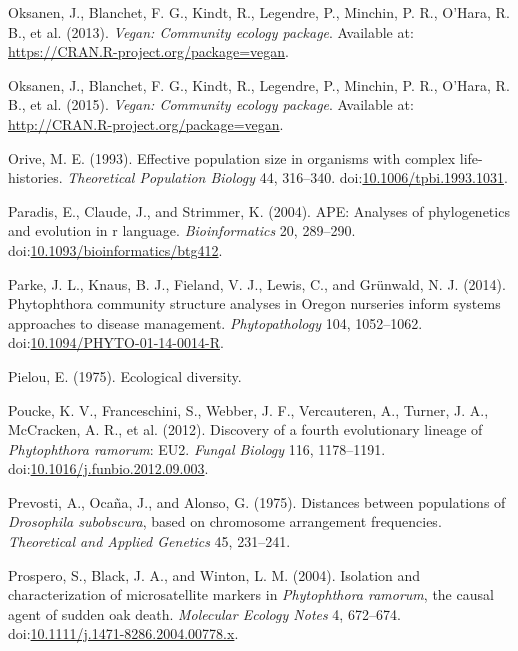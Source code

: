 \documentclass[double,12pt]{beavtex}
\begin{document}
  \hypertarget{ref-oksanen2013vegan}{}
  Oksanen, J., Blanchet, F. G., Kindt, R., Legendre, P., Minchin, P. R.,
  O'Hara, R. B., et al. (2013). \emph{Vegan: Community ecology package}.
  Available at: \url{https://CRAN.R-project.org/package=vegan}.
  
  \hypertarget{ref-oksanen2015vegan}{}
  Oksanen, J., Blanchet, F. G., Kindt, R., Legendre, P., Minchin, P. R.,
  O'Hara, R. B., et al. (2015). \emph{Vegan: Community ecology package}.
  Available at: \url{http://CRAN.R-project.org/package=vegan}.
  
  \hypertarget{ref-orive1993effective}{}
  Orive, M. E. (1993). Effective population size in organisms with complex
  life-histories. \emph{Theoretical Population Biology} 44, 316--340.
  doi:\href{https://doi.org/10.1006/tpbi.1993.1031}{10.1006/tpbi.1993.1031}.
  
  \hypertarget{ref-paradis2004ape}{}
  Paradis, E., Claude, J., and Strimmer, K. (2004). APE: Analyses of
  phylogenetics and evolution in r language. \emph{Bioinformatics} 20,
  289--290.
  doi:\href{https://doi.org/10.1093/bioinformatics/btg412}{10.1093/bioinformatics/btg412}.
  
  \hypertarget{ref-parke2014phytophthora}{}
  Parke, J. L., Knaus, B. J., Fieland, V. J., Lewis, C., and Grünwald, N.
  J. (2014). Phytophthora community structure analyses in Oregon nurseries
  inform systems approaches to disease management. \emph{Phytopathology}
  104, 1052--1062.
  doi:\href{https://doi.org/10.1094/PHYTO-01-14-0014-R}{10.1094/PHYTO-01-14-0014-R}.
  
  \hypertarget{ref-pielou1975ecological}{}
  Pielou, E. (1975). Ecological diversity.
  
  \hypertarget{ref-vanpoucke2012discovery}{}
  Poucke, K. V., Franceschini, S., Webber, J. F., Vercauteren, A., Turner,
  J. A., McCracken, A. R., et al. (2012). Discovery of a fourth
  evolutionary lineage of \emph{Phytophthora ramorum}: EU2. \emph{Fungal
  Biology} 116, 1178--1191.
  doi:\href{https://doi.org/10.1016/j.funbio.2012.09.003}{10.1016/j.funbio.2012.09.003}.
  
  \hypertarget{ref-prevosti1975distances}{}
  Prevosti, A., Ocaña, J., and Alonso, G. (1975). Distances between
  populations of \emph{Drosophila subobscura}, based on chromosome
  arrangement frequencies. \emph{Theoretical and Applied Genetics} 45,
  231--241.
  
  \hypertarget{ref-prospero2004isolation}{}
  Prospero, S., Black, J. A., and Winton, L. M. (2004). Isolation and
  characterization of microsatellite markers in \emph{Phytophthora
  ramorum}, the causal agent of sudden oak death. \emph{Molecular Ecology
  Notes} 4, 672--674.
  doi:\href{https://doi.org/10.1111/j.1471-8286.2004.00778.x}{10.1111/j.1471-8286.2004.00778.x}.
  
\end{document}

